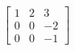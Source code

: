 \documentclass[preview]{standalone}
\begin{document}
\begin{align*}
\begin{bmatrix} 1 & 2 & 3 \\ 0 & 0 & -2 \\ 0 & 0 & -1 \end{bmatrix}
\end{align*}
\end{document}
